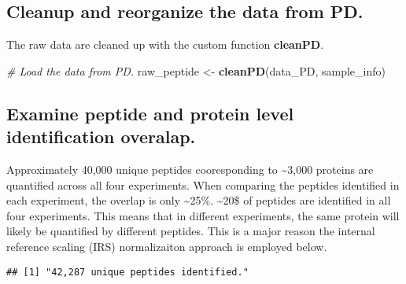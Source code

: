 \documentclass[]{article}
\newenvironment{Shaded}{\begin{snugshade}}{\end{snugshade}}
\newcommand{\KeywordTok}[1]{\textcolor[rgb]{0.13,0.29,0.53}{\textbf{#1}}}
\newcommand{\DataTypeTok}[1]{\textcolor[rgb]{0.13,0.29,0.53}{#1}}
\newcommand{\StringTok}[1]{\textcolor[rgb]{0.31,0.60,0.02}{#1}}
\newcommand{\CommentTok}[1]{\textcolor[rgb]{0.56,0.35,0.01}{\textit{#1}}}
\newcommand{\OperatorTok}[1]{\textcolor[rgb]{0.81,0.36,0.00}{\textbf{#1}}}
\newcommand{\NormalTok}[1]{#1}
\begin{document}
\subsection{Cleanup and reorganize the data from
PD.}\label{cleanup-and-reorganize-the-data-from-pd.}

The raw data are cleaned up with the custom function \textbf{cleanPD}.

\begin{Shaded}
\begin{Highlighting}[]
\CommentTok{# Load the data from PD.}
\NormalTok{raw_peptide <-}\StringTok{ }\KeywordTok{cleanPD}\NormalTok{(data_PD, sample_info)}
\end{Highlighting}
\end{Shaded}

\subsection{Examine peptide and protein level identification
overalap.}\label{examine-peptide-and-protein-level-identification-overalap.}

Approximately 40,000 unique peptides cooresponding to
\textasciitilde{}3,000 proteins are quantified across all four
experiments. When comparing the peptides identified in each experiment,
the overlap is only \textasciitilde{}25\%. \textasciitilde{}20\$ of
peptides are identified in all four experiments. This means that in
different experiments, the same protein will likely be quantified by
different peptides. This is a major reason the internal reference
scaling (IRS) normalizaiton approach is employed below.

\begin{Shaded}
\end{Shaded}

\begin{verbatim}
## [1] "42,287 unique peptides identified."
\end{verbatim}
\end{document}
